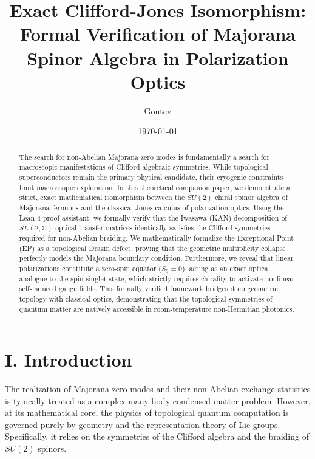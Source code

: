 \documentclass[aps,prx,twocolumn,superscriptaddress,amsmath,amssymb]{revtex4-2}
\begin{document}

\title{Exact Clifford-Jones Isomorphism: Formal Verification of Majorana Spinor Algebra in Polarization Optics}

\author{Goutev}

\date{\today}

\begin{abstract}
The search for non-Abelian Majorana zero modes is fundamentally a search for macroscopic manifestations of Clifford algebraic symmetries. While topological superconductors remain the primary physical candidate, their cryogenic constraints limit macroscopic exploration. In this theoretical companion paper, we demonstrate a strict, exact mathematical isomorphism between the $SU(2)$ chiral spinor algebra of Majorana fermions and the classical Jones calculus of polarization optics. Using the Lean 4 proof assistant, we formally verify that the Iwasawa (KAN) decomposition of $SL(2, \mathbb{C})$ optical transfer matrices identically satisfies the Clifford symmetries required for non-Abelian braiding. We mathematically formalize the Exceptional Point (EP) as a topological Drazin defect, proving that the geometric multiplicity collapse perfectly models the Majorana boundary condition. Furthermore, we reveal that linear polarizations constitute a zero-spin equator ($S_3 = 0$), acting as an exact optical analogue to the spin-singlet state, which strictly requires chirality to activate nonlinear self-induced gauge fields. This formally verified framework bridges deep geometric topology with classical optics, demonstrating that the topological symmetries of quantum matter are natively accessible in room-temperature non-Hermitian photonics.
\end{abstract}

\maketitle

\section{I. Introduction}
The realization of Majorana zero modes and their non-Abelian exchange statistics is typically treated as a complex many-body condensed matter problem. However, at its mathematical core, the physics of topological quantum computation is governed purely by geometry and the representation theory of Lie groups. Specifically, it relies on the symmetries of the Clifford algebra and the braiding of $SU(2)$ spinors.
\end{document}
